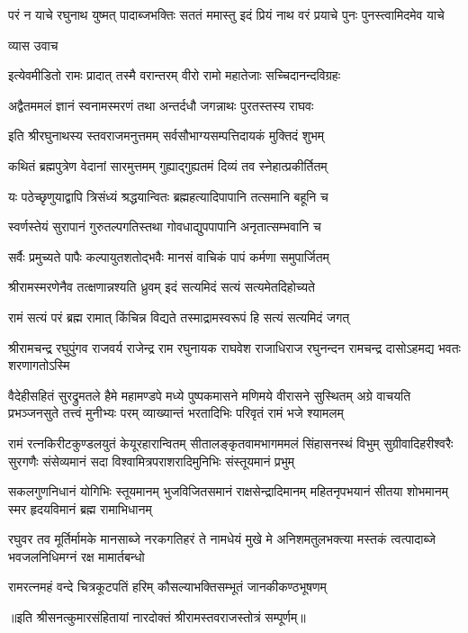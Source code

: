\fourlineindentedshloka
{परं न याचे रघुनाथ युष्मत्}
{पादाब्जभक्तिः सततं ममास्तु}
{इदं प्रियं नाथ वरं प्रयाचे}
{पुनः पुनस्त्वामिदमेव याचे}%

व्यास उवाच

\twolineshloka
{इत्येवमीडितो रामः प्रादात् तस्मै वरान्तरम्}
{वीरो रामो महातेजाः सच्चिदानन्दविग्रहः}%

\twolineshloka
{अद्वैतममलं ज्ञानं स्वनामस्मरणं तथा}
{अन्तर्दधौ जगन्नाथः पुरतस्तस्य राघवः}%

\twolineshloka
{इति श्रीरघुनाथस्य स्तवराजमनुत्तमम्}
{सर्वसौभाग्यसम्पत्तिदायकं मुक्तिदं शुभम्}%

\twolineshloka
{कथितं ब्रह्मपुत्रेण वेदानां सारमुत्तमम्}
{गुह्याद्गुह्यतमं दिव्यं तव स्नेहात्प्रकीर्तितम्}%

\twolineshloka
{यः पठेच्छृणुयाद्वापि त्रिसंध्यं श्रद्धयान्वितः}
{ब्रह्महत्यादिपापानि तत्समानि बहूनि च}%

\twolineshloka
{स्वर्णस्तेयं सुरापानं गुरुतल्पगतिस्तथा}
{गोवधाद्युपपापानि अनृतात्सम्भवानि च}%

\twolineshloka
{सर्वैः प्रमुच्यते पापैः कल्पायुतशतोद्भवैः}
{मानसं वाचिकं पापं कर्मणा समुपार्जितम्}%

\twolineshloka
{श्रीरामस्मरणेनैव तत्क्षणान्नश्यति ध्रुवम्}
{इदं सत्यमिदं सत्यं सत्यमेतदिहोच्यते}%

\twolineshloka
{रामं सत्यं परं ब्रह्म रामात् किंचिन्न विद्यते}
{तस्माद्रामस्वरूपं हि सत्यं सत्यमिदं जगत्}%

\fourlineindentedshloka
{श्रीरामचन्द्र रघुपुंगव राजवर्य} 
{राजेन्द्र राम रघुनायक राघवेश}
{राजाधिराज रघुनन्दन रामचन्द्र}
{दासोऽहमद्य भवतः शरणागतोऽस्मि}%

\fourlineindentedshloka
{वैदेहीसहितं सुरद्रुमतले हैमे महामण्डपे}
{मध्ये पुष्पकमासने मणिमये वीरासने सुस्थितम्}
{अग्रे वाचयति प्रभञ्जनसुते तत्त्वं मुनीभ्यः परम्}
{व्याख्यान्तं भरतादिभिः परिवृतं रामं भजे श्यामलम्}%

\fourlineindentedshloka
{रामं रत्नकिरीटकुण्डलयुतं केयूरहारान्वितम्} 
{सीतालङ्कृतवामभागममलं सिंहासनस्थं विभुम्} 
{सुग्रीवादिहरीश्वरैः सुरगणैः संसेव्यमानं सदा}
{विश्वामित्रपराशरादिमुनिभिः संस्तूयमानं प्रभुम्}%

\fourlineindentedshloka
{सकलगुणनिधानं योगिभिः स्तूयमानम्} 
{भुजविजितसमानं राक्षसेन्द्रादिमानम्} 
{महितनृपभयानं सीतया शोभमानम्}
{स्मर हृदयविमानं ब्रह्म रामाभिधानम्}%

\fourlineindentedshloka
{रघुवर तव मूर्तिर्मामके मानसाब्जे} 
{नरकगतिहरं ते नामधेयं मुखे मे}
{अनिशमतुलभक्त्या मस्तकं त्वत्पादाब्जे}
{भवजलनिधिमग्नं रक्ष मामार्तबन्धो}%

\twolineshloka
{रामरत्नमहं वन्दे चित्रकूटपतिं हरिम्}
{कौसल्याभक्तिसम्भूतं जानकीकण्ठभूषणम्}%

॥इति श्रीसनत्कुमारसंहितायां नारदोक्तं श्रीरामस्तवराजस्तोत्रं सम्पूर्णम्॥